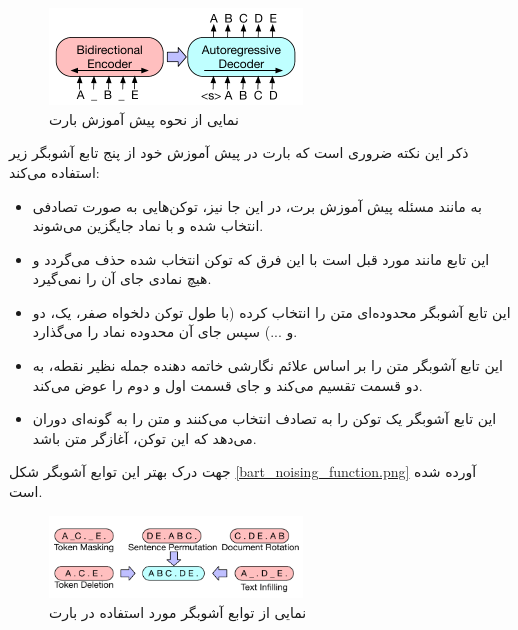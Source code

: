 \begin{figure}[h]
	\centering
	\includegraphics[width=0.6\textwidth]{images/chap3/bart_seq2seq.png}
	\caption{
		نمایی از نحوه پیش آموزش بارت
	}
	\label{fig:chap3:bart_pretraining}
\end{figure}

ذکر این نکته ضروری است که بارت در پیش آموزش خود از پنج تابع آشوبگر زیر استفاده می‌کند:

\begin{itemize}
	\item 
	\textbf{
}

به مانند مسئله پیش آموزش برت، در این جا نیز، توکن‌هایی به صورت تصادفی انتخاب شده و با نماد
\lr{\_}
جایگزین می‌شوند.

\item 
\textbf{
}
این تابع مانند مورد قبل است با این فرق که توکن انتخاب شده حذف می‌گردد و هیچ نمادی جای آن را نمی‌گیرد.

\item 
\textbf{
}
این تابع آشوبگر محدوده‌ای متن را انتخاب کرده (با طول توکن‌ دلخواه صفر، یک، دو و ...) سپس جای آن محدوده نماد 
\lr{\_}
را می‌گذارد.

\item 
\textbf{
} 
	این تابع آشوبگر متن را بر اساس علائم نگارشی خاتمه دهنده جمله نظیر نقطه، به دو قسمت تقسیم می‌کند و جای قسمت اول و دوم را عوض می‌کند.
\item 
\textbf{
} 	
این تابع آشوبگر یک توکن را به تصادف انتخاب می‌کنند و متن را به گونه‌ای دوران می‌دهد که این توکن، آغازگر متن باشد.
\end{itemize}

جهت درک بهتر این توابع آشوبگر شکل
\ref{bart_noising_function.png}
آورده شده است.
 \begin{figure}[h]
	\centering
	\includegraphics[width=0.6\textwidth]{images/chap3/bart_noising_function.png}
	\caption{
		نمایی از توابع آشوبگر مورد استفاده در بارت
	}
	\label{fig:chap3:bart_noising_function}
\end{figure}

